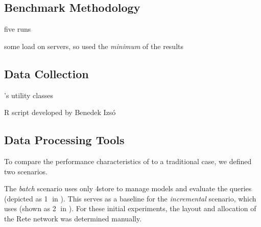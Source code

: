 \subsection{Benchmark Methodology}

five runs

some load on servers, so used the \emph{minimum} of the results

\subsection{Data Collection}

\tb{}'s utility classes

R script \cite{RProject} developed by Benedek Izsó 

\subsection{Data Processing Tools}

To compare the performance characteristics of \iqd{} to a traditional case, we defined two scenarios. 

The \textit{batch} scenario uses only 4store to manage models and evaluate the queries (depicted as \textcircled{1} in ). This serves as a baseline for the \textit{incremental} scenario, which uses \iqd{} (shown as \textcircled{2} in ). For these initial experiments, the layout and allocation of the Rete network was determined manually. 
